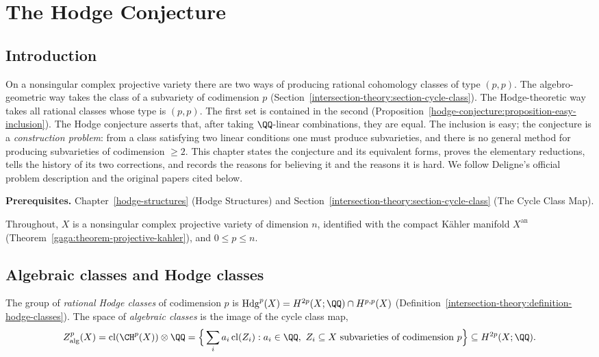 \chapter{The Hodge Conjecture}\label{hodge-conjecture}

\section{Introduction}\label{hodge-conjecture:section-introduction}

On a nonsingular complex projective variety there are two ways of producing rational cohomology classes of type $(p,p)$. The algebro-geometric way takes
the class of a subvariety of codimension $p$ (Section~\ref{intersection-theory:section-cycle-class}). The Hodge-theoretic way takes all rational classes whose type is $(p,p)$. The first
set is contained in the second (Proposition~\ref{hodge-conjecture:proposition-easy-inclusion}). The Hodge conjecture asserts that, after taking $\QQ$-linear
combinations, they are equal. The inclusion is easy; the conjecture is a \emph{construction problem}: from a class satisfying two linear conditions one must produce
subvarieties, and there is no general method for producing subvarieties of codimension $\geq 2$. This chapter states the conjecture and its equivalent forms, proves the
elementary reductions, tells the history of its two corrections, and records the reasons for believing it and the reasons it is hard. We follow Deligne's official
problem description \cite{deligne-clay} and the original papers cited below.

\noindent\textbf{Prerequisites.} Chapter~\ref{hodge-structures} (Hodge Structures) and Section~\ref{intersection-theory:section-cycle-class} (The Cycle Class Map).

Throughout, $X$ is a nonsingular complex projective variety of dimension $n$, identified with the compact K\"ahler manifold $X^{\mathrm{an}}$ (Theorem~\ref{gaga:theorem-projective-kahler}),
and $0 \leq p \leq n$.

\section{Algebraic classes and Hodge classes}\label{hodge-conjecture:section-classes}

\begin{definition}\label{hodge-conjecture:definition-algebraic-classes}
The group of \emph{rational Hodge classes} of codimension $p$ is $\mathrm{Hdg}^p(X) = H^{2p}(X; \QQ) \cap H^{p,p}(X)$ (Definition~\ref{intersection-theory:definition-hodge-classes}). The space
of \emph{algebraic classes} is the image of the cycle class map,
\[
Z^p_{\mathrm{alg}}(X) = \mathrm{cl}(\CH^p(X)) \otimes \QQ = \Big\{\sum_ia_i\,\mathrm{cl}(Z_i) : a_i \in \QQ,\ Z_i \subseteq X \text{ subvarieties of codimension } p\Big\} \subseteq H^{2p}(X; \QQ).
\]
\end{definition}

